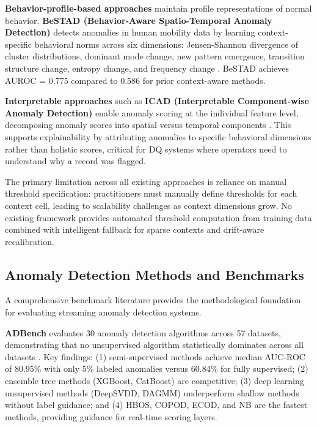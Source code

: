 \textbf{Behavior-profile-based approaches} maintain profile representations of normal behavior. \textbf{BeSTAD (Behavior-Aware Spatio-Temporal Anomaly Detection)} detects anomalies in human mobility data by learning context-specific behavioral norms across six dimensions: Jensen-Shannon divergence of cluster distributions, dominant mode change, new pattern emergence, transition structure change, entropy change, and frequency change \citep{bestad2025}. BeSTAD achieves AUROC = 0.775 compared to 0.586 for prior context-aware methods.

\textbf{Interpretable approaches} such as \textbf{ICAD (Interpretable Component-wise Anomaly Detection)} enable anomaly scoring at the individual feature level, decomposing anomaly scores into spatial versus temporal components \citep{icad2025}. This supports explainability by attributing anomalies to specific behavioral dimensions rather than holistic scores, critical for DQ systems where operators need to understand why a record was flagged.

The primary limitation across all existing approaches is reliance on manual threshold specification: practitioners must manually define thresholds for each context cell, leading to scalability challenges as context dimensions grow. No existing framework provides automated threshold computation from training data combined with intelligent fallback for sparse contexts and drift-aware recalibration.

\subsection{Anomaly Detection Methods and Benchmarks}

A comprehensive benchmark literature provides the methodological foundation for evaluating streaming anomaly detection systems.

\textbf{ADBench} evaluates 30 anomaly detection algorithms across 57 datasets, demonstrating that no unsupervised algorithm statistically dominates across all datasets \citep{adbench2022}. Key findings: (1) semi-supervised methods achieve median AUC-ROC of 80.95\% with only 5\% labeled anomalies versus 60.84\% for fully supervised; (2) ensemble tree methods (XGBoost, CatBoost) are competitive; (3) deep learning unsupervised methods (DeepSVDD, DAGMM) underperform shallow methods without label guidance; and (4) HBOS, COPOD, ECOD, and NB are the fastest methods, providing guidance for real-time scoring layers.


